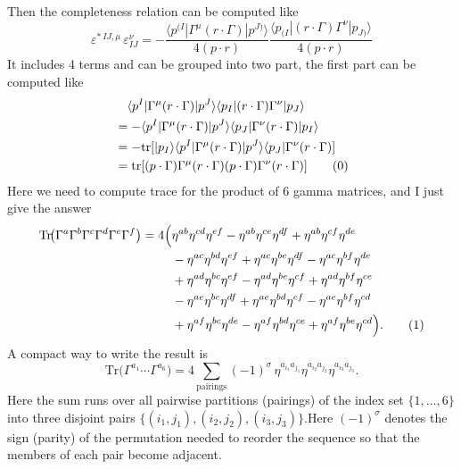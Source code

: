 \documentclass[12pt]{article}
\newcommand{\aket}[1]{|#1\rangle}
\newcommand{\abra}[1]{\langle #1|}
\begin{document}
Then the completeness relation can be computed like
\begin{equation}
    \varepsilon^{*\,IJ,\mu}\,\varepsilon_{IJ}^{\nu}=-\frac{\abra{p^{(I}}\Gamma^\mu(r\cdot \Gamma)\aket{p^{J)}}}{4(p\cdot r)}\frac{\abra{p_{(I}}(r\cdot \Gamma)\Gamma^\nu\aket{p_{J)}}}{4(p\cdot r)}
\end{equation}
It includes 4 terms and can be grouped into two part, the first part can be computed like
\begin{align*}
    &\quad \abra{p^I}\Gamma^\mu(r\cdot \Gamma)\aket{p^J}\abra{p_I}(r\cdot \Gamma)\Gamma^\nu \aket{p_J}\\
    &=-\abra{p^I}\Gamma^\mu(r\cdot \Gamma)\aket{p^J}\abra{p_J}\Gamma^\nu(r\cdot \Gamma) \aket{p_I}\\
    &=-\mathrm{tr}[\aket{p_I}\abra{p^I}\Gamma^\mu(r\cdot \Gamma)\aket{p^J}\abra{p_J}\Gamma^\nu(r\cdot\Gamma)]\\
    &=\mathrm{tr}[(p\cdot \Gamma)\Gamma^\mu(r\cdot \Gamma)(p\cdot \Gamma)\Gamma^\nu (r\cdot \Gamma)] \label{44}\tag{\theequation}\stepcounter{equation}
\end{align*}
Here we need to compute trace for the product of 6 gamma matrices, and I just give the answer
\begin{align*}
\mathrm{Tr}\!\big(\Gamma^{a}\Gamma^{b}\Gamma^{c}\Gamma^{d}\Gamma^{e}\Gamma^{f}\big)=4\Big(
& \eta^{ab}\eta^{cd}\eta^{ef}
-\eta^{ab}\eta^{ce}\eta^{df}
+\eta^{ab}\eta^{cf}\eta^{de} \\
&-\eta^{ac}\eta^{bd}\eta^{ef}
+\eta^{ac}\eta^{be}\eta^{df}
-\eta^{ac}\eta^{bf}\eta^{de} \\
&+\eta^{ad}\eta^{bc}\eta^{ef}
-\eta^{ad}\eta^{be}\eta^{cf}
+\eta^{ad}\eta^{bf}\eta^{ce} \\
&-\eta^{ae}\eta^{bc}\eta^{df}
+\eta^{ae}\eta^{bd}\eta^{cf}
-\eta^{ae}\eta^{bf}\eta^{cd} \\
&+\eta^{af}\eta^{bc}\eta^{de}
-\eta^{af}\eta^{bd}\eta^{ce}
+\eta^{af}\eta^{be}\eta^{cd}
\Big). \tag{\theequation}\stepcounter{equation}
\end{align*}
A compact way to write the result is
\[
\mathrm{Tr}\!\big(\Gamma^{a_1}\cdots\Gamma^{a_6}\big)
= 4 \sum_{\text{pairings}} (-1)^{\sigma}\,
\eta^{a_{i_1} a_{j_1}}\eta^{a_{i_2} a_{j_2}}\eta^{a_{i_3} a_{j_3}} .
\]
Here the sum runs over all pairwise partitions (pairings) of the index set
$\{1,\dots,6\}$ into three disjoint pairs 
$\{(i_1,j_1),(i_2,j_2),(i_3,j_3)\}$.Here $(-1)^{\sigma}$ denotes the sign (parity) of the permutation needed to reorder the sequence so that the members of each pair become adjacent.
\end{document}
